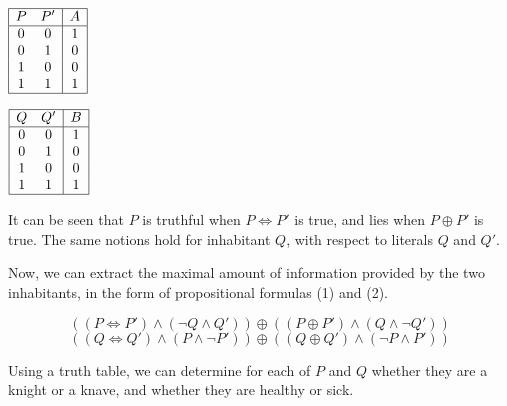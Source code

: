 \documentclass[12pt]{article}
\newcommand{\biim}{\mathbin{\Leftrightarrow}}
\begin{document}
\bigskip
\begin{minipage}{0.5\textwidth}
\begin{center}
$\begin{array}{|cc|c|}
   \hline
   P & P' & A
\\ \hline
   0 & 0 & 1
\\ 0 & 1 & 0
\\ 1 & 0 & 0
\\ 1 & 1 & 1
\\ \hline
\end{array}$
\end{center}
\end{minipage}
\begin{minipage}{0.35\textwidth}
\begin{center}
$\begin{array}{|cc|c|}
   \hline
   Q & Q' & B
\\ \hline
   0 & 0 & 1
\\ 0 & 1 & 0
\\ 1 & 0 & 0
\\ 1 & 1 & 1
\\ \hline
\end{array}$
\end{center}
\end{minipage}

\bigskip
\noindent
It can be seen that $P$ is truthful when $P \biim P'$ is true, and lies when $P 
\oplus P'$ is true. The same notions hold for inhabitant $Q$, with respect to 
literals $Q$ and $Q'$.

\bigskip
\noindent
Now, we can extract the maximal amount of information provided by the two 
inhabitants, in the form of propositional formulas (1) and (2).

\bigskip
\begin{equation}
((P \biim P') \land (\neg Q \land Q')) \oplus ((P \oplus P') \land (Q \land \neg Q'))
\end{equation}
\begin{equation}
((Q \biim Q') \land (P \land \neg P')) \oplus ((Q \oplus Q') \land (\neg P \land P'))
\end{equation}

\bigskip
\noindent
Using a truth table, we can determine for each of $P$ and $Q$ whether they 
are a knight or a knave, and whether they are healthy or sick.
\end{document}
